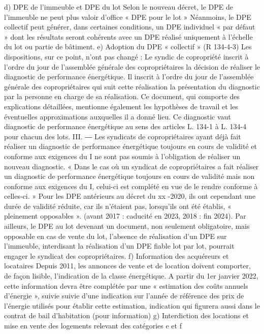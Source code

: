 			d) DPE de l’immeuble et DPE du lot
			Selon le nouveau décret, le DPE de l’immeuble ne peut plus valoir d’office « DPE pour le lot »
			Néanmoins, le DPE collectif peut générer, dans certaines conditions, un DPE individuel « par défaut » dont les résultats seront cohérents avec un DPE réalisé uniquement à l’échelle du lot ou partie de bâtiment.
			e) Adoption du DPE « collectif » (R 134-4-3)
			Les dispositions, sur ce point, n’ont pas changé : Le syndic de copropriété inscrit à l'ordre du jour de l'assemblée générale des copropriétaires la décision de réaliser le diagnostic de performance énergétique. Il inscrit à l'ordre du jour de l'assemblée générale des copropriétaires qui suit cette réalisation la présentation du diagnostic par la personne en charge de sa réalisation. Ce document, qui comporte des explications détaillées, mentionne également les hypothèses de travail et les éventuelles approximations auxquelles il a donné lieu.
			Ce diagnostic vaut diagnostic de performance énergétique au sens des articles L. 134-1 à L. 134-4 pour chacun des lots.
			III. ― Les syndicats de copropriétaires ayant déjà fait réaliser un diagnostic de performance énergétique toujours en cours de validité et conforme aux exigences du I ne sont pas soumis à l'obligation de réaliser un nouveau diagnostic. « Dans le cas où un syndicat de copropriétaires a fait réaliser un diagnostic de performance énergétique toujours en cours de validité mais non conforme aux exigences du I, celui-ci est complété en vue de le rendre conforme à celles-ci. »
			Pour les DPE antérieurs au décret du xx -2020, ils ont cependant une durée de validité réduite, car ils n’étaient pas, lorsqu’ils ont été établis, « pleinement opposables ». (avant 2017 : caducité en 2023, 2018 : fin 2024).
			Par ailleurs, le DPE au lot devenant un document, non seulement obligatoire, mais opposable en cas de vente du lot, l’absence de réalisation d’un DPE sur l’immeuble, interdisant la réalisation d’un DPE fiable lot par lot, pourrait engager le syndicat des copropriétaires.
			f) Information des acquéreurs et locataires
			Depuis 2011, les annonces de vente et de location doivent comporter, de façon lisible, l’indication de la classe énergétique.
			A partir du 1er janvier 2022, cette information devra être complétée par une « estimation des coûts annuels d’énergie », suivie suivie d’une indication sur l’année de référence des prix de l’énergie utilisés pour établir cette estimation, indication qui figurera aussi dans le contrat de bail d’habitation (pour information)
			g) Interdiction des locations et mise en vente des logements relevant des catégories e et f
